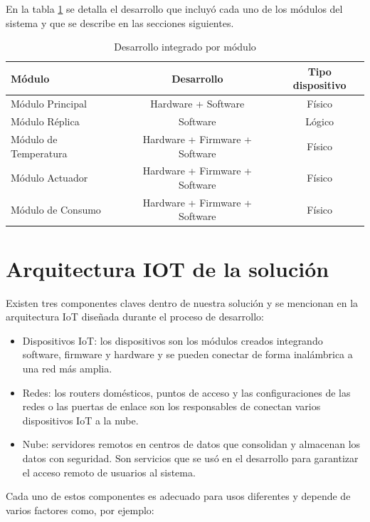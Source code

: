 En la tabla \ref{tab:tablamodulos} se detalla el desarrollo que incluyó cada uno de los módulos del sistema y que se describe en las secciones siguientes.

\begin{table}[h]
	\centering
	\caption[Desarrollo integrado por módulo]{Desarrollo integrado por módulo}
	\begin{tabular}{l c c }    
		\toprule
		\textbf{Módulo} 	 & \textbf{Desarrollo}  & \textbf{Tipo dispositivo}\\
		\midrule
		Módulo Principal & Hardware + Software & Físico\\		
		Módulo Réplica & Software & Lógico \\
		Módulo de Temperatura & Hardware + Firmware + Software & Físico\\		
		Módulo Actuador & Hardware + Firmware + Software & Físico\\		
		Módulo de Consumo	 & Hardware + Firmware + Software & Físico\\
		
		\bottomrule
		\hline
	\end{tabular}
	\label{tab:tablamodulos}
\end{table}


\section{Arquitectura IOT de la solución}

Existen tres componentes claves dentro de nuestra solución y se mencionan en la arquitectura IoT diseñada durante el proceso de desarrollo: 


\begin{itemize}
\item Dispositivos IoT: los dispositivos son los módulos creados integrando software, firmware y hardware y se pueden conectar de forma inalámbrica a una red más amplia.
\item Redes: los routers domésticos, puntos de acceso y las configuraciones de las redes o las puertas de enlace son los responsables de conectan varios dispositivos IoT a la nube.
\item Nube: servidores remotos en centros de datos que consolidan y almacenan los datos con seguridad. Son servicios que se usó en el desarrollo para garantizar el acceso remoto de usuarios al sistema.
\end{itemize}
\vspace{0.5cm}
Cada uno de estos componentes es adecuado para usos diferentes y depende de varios factores como, por ejemplo:

